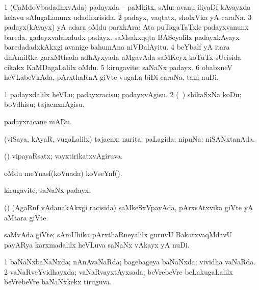 \bentry
{} 
\gl{\nA}
\expl{}
\bmng
\bnum
\num{1} (CaMdoVbadadhxvAda) padayxda -- paMkitx, sAlu:  avanu iliyaDf kAvayxda kelavu sAlugaLanunx udadhxrisida. 
\num{2} padayx, vaqtatx, sholxVka yA caraNa. 
\num{3} padayx(kAvayx) yA adara oMdu parxkAra:  Ata puTagaTaTxle padayxvanunx bareda.  gadayxvalalxdudx padayx.  saMsakxqqta BASeyalilx padayxkAvayx baredadadxkAkxgi avanige bahumAna niVDalAyitu. 
\num{4} beYbalf yA itara dhAmiRka garxMthada adhAyxyada aMgavAda saMKeyx koTuTx sUcisida cikakx KaMDagaLalilx oMdu. 
\num{5} kirugavite; saNaNx padayx. 
\num{6} obabxneV heVLabeVkAda, pArxthaRnA giVte \mo vugaLa biDi caraNa, tani nuDi. 
\enum
\emng
\eentry

\bentry
{} 
\gl{\sakirx}
\expl{}
\bmng
\bnum
\num{1} padayxdalilx heVLu; padayxracisu; padayxvAgisu. 
\num{2} (\sA\ \AtAmx) shikaSxNa koDu; boVdhisu; tajacnxnAgisu. 
\enum
\emng

\noindent 
\gl{\akirx}
\expl{}
\bmng
 padayxracane mADu. 
\emng
\eentry

\bentry
{} 
\gl{\gu}
\expl{}
\bmng
 (viSaya, kAyaR, \mo vugaLalilx) tajacnx; nurita; paLagida; nipuNa; niSANxtanAda. 
\emng
\eentry

\bentry
{} 
\gl{\gu}
\expl{}
\bmng
 (\ga) vipayaRsatx; vayxtirikatxvAgiruva. 
\emng
\eentry

\bentry
{}
\gl{\nA}
\expl{}
\bmng
 oMdu meYnasf(koVnada) koVseYnf(). 
\emng
\eentry

\bentry
{} 
\gl{\nA}
\expl{}
\bmng
 kirugavite; saNaNx padayx. 
\emng
\eentry

\bentry
{} 
\gl{\nA}
\expl{}
\bmng
 (\saM) (AgaRnf vAdanakAkxgi racisida) saMkeSxVpavAda, pArxsAtxvika giVte yA aMtara giVte. 
\emng
\eentry

\bentry 
{} 
\gl{\nA}
\expl{}
\bmng
 saMvAda giVte; sAmUhika pArxthaRneyalilx guruvU BakatxvaqMdavU payARya karxmadalilx heVLuva saNaNx vAkayx yA nuDi. 
\emng
\eentry

\bentry
{} 
\gl{\gu}
\expl{}
\bmng
\bnum
\num{1} baNaNxbaNaNxda; nAnAvaNaRda; bagebageya baNaNxda; vividha vaNaRda. 
\num{2} vaNaRveYvidhayxda; vaNaRvayxtAyxsada; beVrebeVre beLakugaLalilx beVrebeVre baNaNxkekx tiruguva. 
\enum
\emng
\eentry

